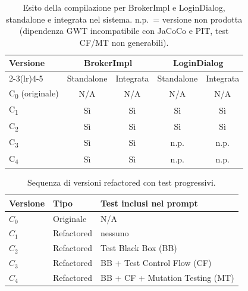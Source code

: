 \begin{table}[h!]
\centering
\small
\begin{tabular}{@{}lcccc@{}}
\toprule
\textbf{Versione} & \multicolumn{2}{c}{\textbf{BrokerImpl}} & \multicolumn{2}{c}{\textbf{LoginDialog}} \\
\cmidrule(lr){2-3}\cmidrule(lr){4-5}
 & Standalone & Integrata & Standalone & Integrata \\
\midrule
C\textsubscript{0} (originale) & N/A & N/A & N/A & N/A \\
C\textsubscript{1}             & Sì  & Sì  & Sì  & Sì  \\
C\textsubscript{2}             & Sì  & Sì  & Sì  & Sì  \\
C\textsubscript{3}             & Sì  & Sì  & n.p. & n.p. \\
C\textsubscript{4}             & Sì  & Sì  & n.p. & n.p. \\
\bottomrule
\end{tabular}
\caption{Esito della compilazione per BrokerImpl e LoginDialog, standalone e integrata
         nel sistema. n.p.\ = versione non prodotta (dipendenza GWT incompatibile con
         JaCoCo e PIT, test CF/MT non generabili).}
\label{tab:m4-compile}
\end{table}

\begin{table}[h!]
\centering
\small
\begin{tabular}{@{}lll@{}}
\toprule
\textbf{Versione} & \textbf{Tipo} & \textbf{Test inclusi nel prompt} \\
\midrule
$C_0$ & Originale  & N/A \\
$C_1$ & Refactored & nessuno \\
$C_2$ & Refactored & Test Black Box (BB) \\
$C_3$ & Refactored & BB + Test Control Flow (CF) \\
$C_4$ & Refactored & BB + CF + Mutation Testing (MT) \\
\bottomrule
\end{tabular}
\caption{Sequenza di versioni refactored con test progressivi.}
\label{tab:m4-versions}
\end{table}

